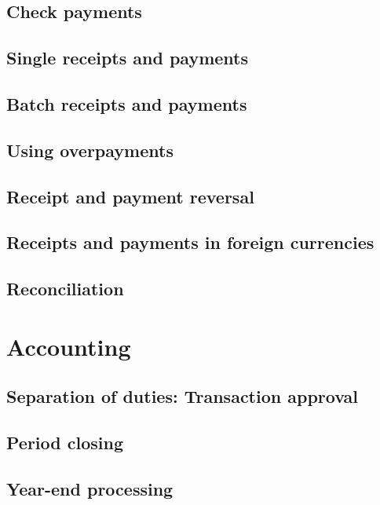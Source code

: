 \section{Check payments}

\section{Single receipts and payments}

\section{Batch receipts and payments}

\section{Using overpayments}
\label{sec:UsingOverpayments}

\section{Receipt and payment reversal}

\section{Receipts and payments in foreign currencies}

\section{Reconciliation}
\label{sec:Reconciliation}

\chapter{Accounting}

\section{Separation of duties: Transaction approval}
\label{sec:SeparationOfDuties}

\section{Period closing}

\section{Year-end processing}

